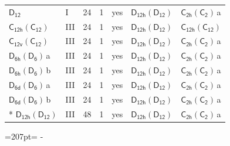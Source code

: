 \documentclass[10pt,a4paper]{article}
\newcommand{\needspace}[1]{\par\penalty-100\begingroup\dimen0=#1\relax\dimen2=\pagegoal
  \advance\dimen2-\pagetotal\ifdim\dimen0>\dimen2\relax\ifdim\dimen2>0pt\vfil\break\fi\fi
  \endgroup}
\numberwithin{equation}{section}
\newcommand{\grp}[1]{\mathsf{#1}}
\newcommand{\clsletter}[1]{\,{\scriptsize\color{black!55}#1}}
\begin{document}
{\begin{longtable}{@{}llrrlll@{}}
\href{../../../rotation/data/pdf/D12.pdf}{$\grp{D_{12}}$} & I & 24 & 1 & yes & \href{D12h-D12.pdf}{$\grp{D_{12h}}(\grp{D_{12}})$} & \href{C2h-C2.pdf}{$\grp{C_{2h}}(\grp{C_{2}})$}\clsletter{a}\\
\href{C12h-C12.pdf}{$\grp{C_{12h}}(\grp{C_{12}})$} & III & 24 & 1 & yes & \href{D12h-D12.pdf}{$\grp{D_{12h}}(\grp{D_{12}})$} & \href{C12h-C12.pdf}{$\grp{C_{12h}}(\grp{C_{12}})$}\\
\href{C12v-C12.pdf}{$\grp{C_{12v}}(\grp{C_{12}})$} & III & 24 & 1 & yes & \href{D12h-D12.pdf}{$\grp{D_{12h}}(\grp{D_{12}})$} & \href{C2h-C2.pdf}{$\grp{C_{2h}}(\grp{C_{2}})$}\clsletter{a}\\
\href{D6h-D6.pdf}{$\grp{D_{6h}}(\grp{D_{6}})$}\clsletter{a} & III & 24 & 1 & yes & \href{D12h-D12.pdf}{$\grp{D_{12h}}(\grp{D_{12}})$} & \href{C2h-C2.pdf}{$\grp{C_{2h}}(\grp{C_{2}})$}\clsletter{a}\\
\href{D6h-D6.pdf}{$\grp{D_{6h}}(\grp{D_{6}})$}\clsletter{b} & III & 24 & 1 & yes & \href{D12h-D12.pdf}{$\grp{D_{12h}}(\grp{D_{12}})$} & \href{C2h-C2.pdf}{$\grp{C_{2h}}(\grp{C_{2}})$}\clsletter{a}\\
\href{D6d-D6.pdf}{$\grp{D_{6d}}(\grp{D_{6}})$}\clsletter{a} & III & 24 & 1 & yes & \href{D12h-D12.pdf}{$\grp{D_{12h}}(\grp{D_{12}})$} & \href{C2h-C2.pdf}{$\grp{C_{2h}}(\grp{C_{2}})$}\clsletter{a}\\
\href{D6d-D6.pdf}{$\grp{D_{6d}}(\grp{D_{6}})$}\clsletter{b} & III & 24 & 1 & yes & \href{D12h-D12.pdf}{$\grp{D_{12h}}(\grp{D_{12}})$} & \href{C2h-C2.pdf}{$\grp{C_{2h}}(\grp{C_{2}})$}\clsletter{a}\\*
\href{D12h-D12.pdf}{$\grp{D_{12h}}(\grp{D_{12}})$} & III & 48 & 1 & yes & \href{D12h-D12.pdf}{$\grp{D_{12h}}(\grp{D_{12}})$} & \href{C2h-C2.pdf}{$\grp{C_{2h}}(\grp{C_{2}})$}\clsletter{a}\\
\bottomrule\end{longtable}}
\needspace{207pt}
\end{document}
